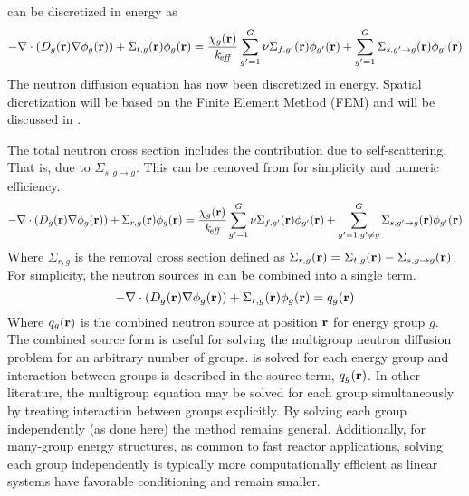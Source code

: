    can be discretized in energy as
  \begin{align}\label{eq:multigroup_diffusion}
    - \mathbf{\nabla} \cdot ( D_g(\mathbf{r}) \mathbf{\nabla} \phi_g(\mathbf{r})) + \Sigma_{t,g}(\mathbf{r}) \phi_g(\mathbf{r})= 
      \frac{\chi_g(\mathbf{r})}{k_{\!\mbox{\scriptsize \em eff}}} \sum_{g'=1}^{G} \nu\Sigma_{f,g'}(\mathbf{r}) 
      \phi_{g'}(\mathbf{r}) + \sum_{g'=1}^{G} \Sigma_{s,g' \rightarrow g}(\mathbf{r}) 
      \phi_{g'}(\mathbf{r})
  \end{align}
  The neutron diffusion equation has now been discretized in energy.
  Spatial dicretization will be based on the Finite Element Method (FEM) and 
  will be discussed in .
  
  The total neutron cross section includes the contribution due to 
  self-scattering. That is, due to $\Sigma_{s,g\rightarrow g}$. This can be 
  removed from  for simplicity and numeric
  efficiency.
  \begin{equation} \label{eq:multigroup_removal}
    - \mathbf{\nabla} \cdot( D_g(\mathbf{r}) \mathbf{\nabla} \phi_g(\mathbf{r})) + \Sigma_{r,g}(\mathbf{r}) \phi_g(\mathbf{r}) = 
      \frac{\chi_g(\mathbf{r})}{k_{\!\mbox{\scriptsize \em eff}}} \sum_{g'=1}^{G} \nu\Sigma_{f,g'}(\mathbf{r}) 
      \phi_{g'}(\mathbf{r}) + \sum_{g'=1, g' \ne g}^{G} 
      \Sigma_{s,g' \rightarrow g}(\mathbf{r}) \phi_{g'}(\mathbf{r})
  \end{equation}
  Where $\Sigma_{r,g}$ is the removal cross section defined as 
  $\Sigma_{r,g}(\mathbf{r}) = \Sigma_{t,g}(\mathbf{r}) - \Sigma_{s,g\rightarrow g}(\mathbf{r})$. For
  simplicity, the neutron sources in  can be 
  combined into a single term.
  \begin{equation} \label{eq:multigroup_source}
    - \mathbf{\nabla} \cdot( D_g(\mathbf{r}) \mathbf{\nabla} \phi_g(\mathbf{r})) + \Sigma_{r,g}(\mathbf{r}) \phi_g(\mathbf{r}) = 
      q_g(\mathbf{r})
  \end{equation}
  Where $q_g(\mathbf{r})$ is the combined neutron source at position $\mathbf{r}$ for energy 
  group $g$. The combined source form is useful for solving the
  multigroup neutron diffusion problem for an arbitrary number of groups.
  is solved for each energy group and interaction between groups is
  described in the source term, $q_g(\mathbf{r})$. In other literature, the multigroup
  equation may be
  solved for each group simultaneously by treating interaction between groups
  explicitly. By solving each group independently (as done here) the method 
  remains general. Additionally, for many-group energy structures, as common to
  fast reactor applications, solving each group independently is typically more
  computationally efficient as linear systems have favorable conditioning and
  remain smaller.
  
